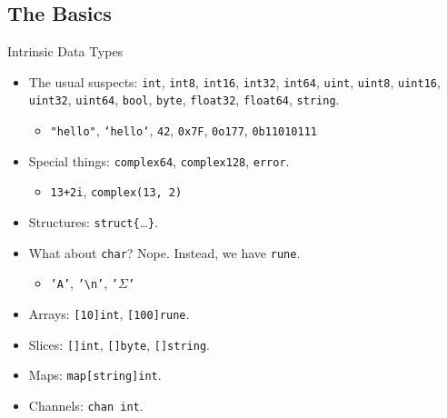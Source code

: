 \documentclass[pdf]{beamer}
\newcommand\z[1]{\texttt{#1}}
\newcommand\identifier[1]{{\color{green!70!black}\z{#1}}}
\newcommand\keyword[1]{{\color{blue}\z{#1}}}
\newcommand\gostring[1]{{\color{orange!90!black}\z{#1}}}
\begin{document}
\subsection{The Basics}
\begin{frame}{Intrinsic Data Types}
    \begin{itemize}
        \item The usual suspects: 
            \keyword{int}, 
            \keyword{int8}, 
            \keyword{int16}, 
            \keyword{int32}, 
            \keyword{int64}, 
            \keyword{uint}, 
            \keyword{uint8}, 
            \keyword{uint16}, 
            \keyword{uint32}, 
            \keyword{uint64}, 
            \keyword{bool},
            \keyword{byte},
            \keyword{float32},
            \keyword{float64},
            \keyword{string}.
            \begin{itemize}
                \item \gostring{"hello"}, \gostring{`hello`}, \z{42}, \z{0x7F}, \z{0o177}, \z{0b11010111}
            \end{itemize}
            \pause
        \item Special things:
            \keyword{complex64},
            \keyword{complex128},
            \keyword{error}.
            \begin{itemize}
                \item \z{13+2i}, \identifier{complex}\z{(13, 2)}
            \end{itemize}
            \pause
        \item Structures: \keyword{struct}\z{\{}\dots\z{\}}.
            \pause
        \item What about \keyword{char}? Nope. Instead, we have \keyword{rune}.
            \begin{itemize}
                \item \gostring{'A'}, \gostring{'\textbackslash n'}, \gostring{'$\Sigma$'}
            \end{itemize}
            \pause
        \item Arrays: \z{[10]}\keyword{int}, \z{[100]}\keyword{rune}.
            \pause
        \item Slices: \z{[]}\keyword{int}, \z{[]}\keyword{byte}, \z{[]}\keyword{string}.
            \pause
        \item Maps: \keyword{map}\z{[}\keyword{string}\z{]}\keyword{int}.
            \pause
        \item Channels: \keyword{chan int}.
    \end{itemize}
\end{frame}
\end{document}
